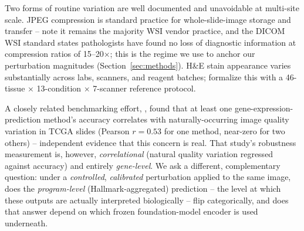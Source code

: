 \documentclass[11pt]{article}
\begin{document}
Two forms of routine variation are well documented and unavoidable at multi-site scale. JPEG compression is standard practice for whole-slide-image storage and transfer -- \citet{jpeg_compression_pathology} note it remains the majority WSI vendor practice, and the DICOM WSI standard \citep{dicom_wsi_standard} states pathologists have found no loss of diagnostic information at compression ratios of 15--20$\times$; this is the regime we use to anchor our perturbation magnitudes (Section~\ref{sec:methods}). H\&E stain appearance varies substantially across labs, scanners, and reagent batches; \citet{plism_protocol} formalize this with a 46-tissue $\times$ 13-condition $\times$ 7-scanner reference protocol.

A closely related benchmarking effort, \citet{wang2025_translational}, found that at least one gene-expression-prediction method's accuracy correlates with naturally-occurring image quality variation in TCGA slides (Pearson $r=0.53$ for one method, near-zero for two others) -- independent evidence that this concern is real. That study's robustness measurement is, however, \emph{correlational} (natural quality variation regressed against accuracy) and entirely \emph{gene-level}. We ask a different, complementary question: under a \emph{controlled}, \emph{calibrated} perturbation applied to the same image, does the \emph{program-level} (Hallmark-aggregated) prediction -- the level at which these outputs are actually interpreted biologically -- flip categorically, and does that answer depend on which frozen foundation-model encoder is used underneath.
\end{document}
